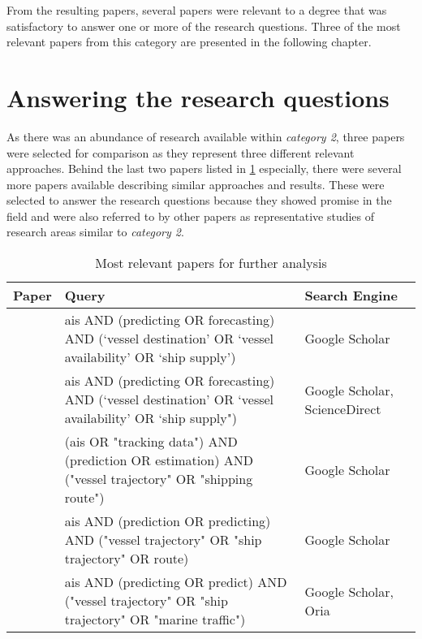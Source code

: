 From the resulting papers, several papers were relevant to a degree that was satisfactory to answer one or more of the research questions. Three of the most relevant papers from this category are presented in the following chapter.

\section{Answering the research questions}

As there was an abundance of research available within \textit{category 2}, three papers were selected for comparison as they represent three different relevant approaches. Behind the last two papers listed in \cref{tab:relevant_papers} especially, there were several more papers available describing similar approaches and results. These were selected to answer the research questions because they showed promise in the field and were also referred to by other papers as representative studies of research areas similar to \textit{category 2}.

\begin{table}
    \centering
    \begin{tabular}{p{1in} p{2.5in} p{1in}}
        \toprule
        \textbf{Paper} & \textbf{Query} & \textbf{Search Engine} \\
        \midrule
        \cite{lechtenberg2019} & ais AND (predicting OR forecasting) AND (`vessel destination' OR `vessel availability' OR `ship supply') & Google Scholar \\
        \midrule
        \cite{ZHANG2020102729} & ais AND (predicting OR forecasting) AND (`vessel destination' OR `vessel availability' OR `ship supply") & Google Scholar, ScienceDirect \\
        \midrule
        \cite{Pelizzari2016GeneticAF} & (ais OR "tracking data") AND (prediction OR estimation) AND ("vessel trajectory" OR "shipping route") & Google Scholar \\
        \midrule
        \cite{pallotta} & ais AND (prediction OR predicting) AND ("vessel trajectory" OR "ship trajectory" OR route) & Google Scholar \\
        \midrule
        \cite{Daranda2016NeuralNA} & ais AND (predicting OR predict) AND ("vessel trajectory" OR "ship trajectory" OR "marine traffic") & Google Scholar, Oria \\
        \bottomrule
    \end{tabular}
    \caption{Most relevant papers for further analysis}
    \label{tab:relevant_papers}
\end{table}

